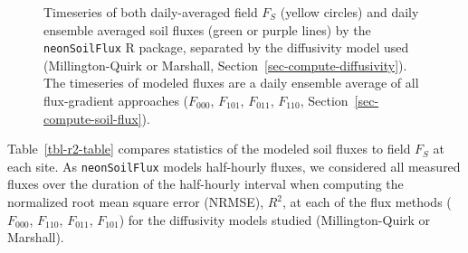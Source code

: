 \documentclass[
  letterpaper,
  DIV=11,
  numbers=noendperiod]{scrartcl}
\begin{document}
\begin{figure}


\caption{\label{fig-flux-results-year}Timeseries of both daily-averaged
field \(F_{S}\) (yellow circles) and daily ensemble averaged soil fluxes
(green or purple lines) by the \texttt{neonSoilFlux} R package,
separated by the diffusivity model used (Millington-Quirk or Marshall,
Section~\ref{sec-compute-diffusivity}). The timeseries of modeled fluxes
are a daily ensemble average of all flux-gradient approaches
(\(F_{000}\), \(F_{101}\), \(F_{011}\), \(F_{110}\),
Section~\ref{sec-compute-soil-flux}).}

\end{figure}%

Table~\ref{tbl-r2-table} compares statistics of the modeled soil fluxes
to field \(F_{S}\) at each site. As \texttt{neonSoilFlux} models
half-hourly fluxes, we considered all measured fluxes over the duration
of the half-hourly interval when computing the normalized root mean
square error (NRMSE), \(R^{2}\), at each of the flux methods
(\(F_{000}\), \(F_{110}\), \(F_{011}\), \(F_{101}\)) for the diffusivity
models studied (Millington-Quirk or Marshall).
\end{document}
